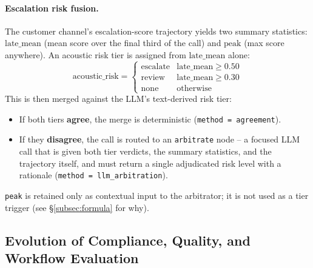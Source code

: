 \paragraph{Escalation risk fusion.}
The customer channel's escalation-score trajectory yields two summary
statistics: $\text{late\_mean}$ (mean score over the final third of the
call) and $\text{peak}$ (max score anywhere). An acoustic risk tier is
assigned from $\text{late\_mean}$ alone:
\[
  \text{acoustic\_risk} =
  \begin{cases}
    \text{escalate} & \text{late\_mean} \ge 0.50 \\
    \text{review}   & \text{late\_mean} \ge 0.30 \\
    \text{none}     & \text{otherwise}
  \end{cases}
\]
This is then merged against the LLM's text-derived risk tier:
\begin{itemize}
  \item If both tiers \textbf{agree}, the merge is deterministic
        (\texttt{method = agreement}).
  \item If they \textbf{disagree}, the call is routed to an
        \texttt{arbitrate} node -- a focused LLM call that is given both
        tier verdicts, the summary statistics, and the trajectory itself,
        and must return a single adjudicated risk level with a rationale
        (\texttt{method = llm\_arbitration}).
\end{itemize}
\texttt{peak} is retained only as contextual input to the arbitrator; it
is not used as a tier trigger (see \S\ref{subsec:formula} for why).

\subsection{Evolution of Compliance, Quality, and Workflow Evaluation}

